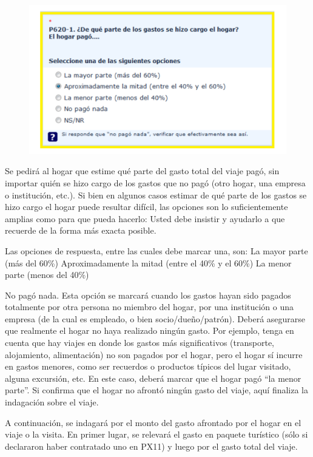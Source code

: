 \documentclass[
  openany]{book}
\begin{document}
\begin{figure}

{\centering \includegraphics[width=1\linewidth]{imagenes/figura6-120} 

}

\end{figure}

Se pedirá al hogar que estime qué parte del gasto total del viaje pagó, sin importar quién se hizo cargo de los gastos que no pagó (otro hogar, una empresa o institución, etc.). Si bien en algunos casos estimar de qué parte de los gastos se hizo cargo el hogar puede resultar difícil, las opciones son lo suficientemente amplias como para que pueda hacerlo: Usted debe insistir y ayudarlo a que recuerde de la forma más exacta posible.

Las opciones de respuesta, entre las cuales debe marcar una, son: La mayor parte (más del 60\%) Aproximadamente la mitad (entre el 40\% y el 60\%) La menor parte (menos del 40\%)

No pagó nada. Esta opción se marcará cuando los gastos hayan sido pagados totalmente por otra persona no miembro del hogar, por una institución o una empresa (de la cual es empleado, o bien socio/dueño/patrón). Deberá asegurarse que realmente el hogar no haya realizado ningún gasto. Por ejemplo, tenga en cuenta que hay viajes en donde los gastos más significativos (transporte, alojamiento, alimentación) no son pagados por el hogar, pero el hogar sí incurre en gastos menores, como ser recuerdos o productos típicos del lugar visitado, alguna excursión, etc. En este caso, deberá marcar que el hogar pagó ``la menor parte''. Si confirma que el hogar no afrontó ningún gasto del viaje, aquí finaliza la indagación sobre el viaje.

A continuación, se indagará por el monto del gasto afrontado por el hogar en el viaje o la visita. En primer lugar, se relevará el gasto en paquete turístico (sólo si declararon haber contratado uno en PX11) y luego por el gasto total del viaje.
\end{document}
